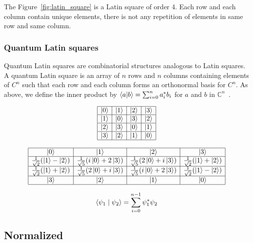  The Figure~\ref{fig:latin_square} is a Latin square of order 4. Each row and each column contain unique elements, there is not any repetition of elements in same row and same column.

\subsubsection{Quantum Latin squares}

Quantum Latin squares are combinatorial structures analogous to Latin squares.
A quantum Latin square is an array of $n$ rows and $n$ columns containing elements of $C^n$ such that each row and each column forms an orthonormal basis for $C^n$.
As above, we define the inner product by $\braket{a | b} = \sum_{i=0}^{n} a_i^* b_i$ for $a$ and $b$ in $\mathbb{C}^n$~\cite{zauner2011QuantumDesignsFoundations}.


$$
\begin{array}{|c|c|c|c|}
  \hline
  \ket{0} & \ket{1} & \ket{2} & \ket{3} \\
  \hline
  \ket{1} & \ket{0} & \ket{3} & \ket{2} \\
  \hline
  \ket{2} & \ket{3} & \ket{0} & \ket{1} \\
  \hline
  \ket{3} & \ket{2} & \ket{1} & \ket{0} \\
  \hline
\end{array}
$$


$$
\begin{array}{|c|c|c|c|}
  \hline
  \ket{0} & \ket{1} & \ket{2} & \ket{3} \\
  \hline
  \frac{1}{\sqrt{2}}(\ket{1}-\ket{2}) & \frac{1}{\sqrt{5}}(i\ket{0}+2\ket{3}) & \frac{1}{\sqrt{5}}(2\ket{0}+i\ket{3}) & \frac{1}{\sqrt{2}}(\ket{1}+\ket{2}) \\
  \hline
  \frac{1}{\sqrt{2}}(\ket{1}+\ket{2}) & \frac{1}{\sqrt{5}}(2\ket{0}+i\ket{3}) & \frac{1}{\sqrt{5}}(i\ket{0}+2\ket{3}) & \frac{1}{\sqrt{2}}(\ket{1}-\ket{2}) \\
  \hline
  \ket{3} & \ket{2} & \ket{1} & \ket{0} \\
  \hline
\end{array}
$$ 


$$
\braket{\psi_1 \mid \psi_2} = \sum_{i=0}^{n-1} \psi_1^* \psi_2
$$

\subsection{Normalized}

